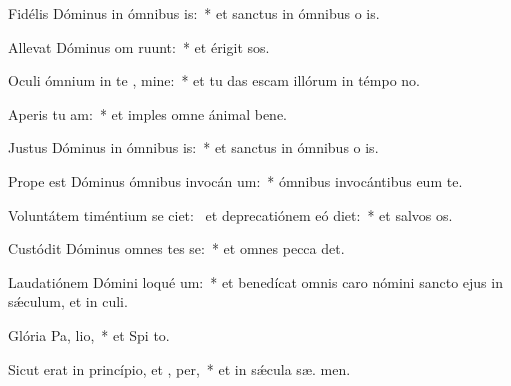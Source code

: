 \item Fidélis Dóminus in ómnibus  is:~* et sanctus in ómnibus o is.
\item Allevat Dóminus om  ruunt:~* et érigit  sos.
\item Oculi ómnium in te , mine:~* et tu das escam illórum in témpo no.
\item Aperis tu  am:~* et imples omne ánimal bene.
\item Justus Dóminus in ómnibus  is:~* et sanctus in ómnibus o is.
\item Prope est Dóminus ómnibus invocán um:~* ómnibus invocántibus eum  te.
\item Voluntátem timéntium se ciet:~\pscross{} et deprecatiónem eó diet:~* et salvos  os.
\item Custódit Dóminus omnes tes se:~* et omnes pecca det.
\item Laudatiónem Dómini loqué  um:~* et benedícat omnis caro nómini sancto ejus in sǽculum, et in  culi.
\item Glória Pa,  lio,~* et Spi to.
\item Sicut erat in princípio, et ,  per,~* et in sǽcula sæ. men.
